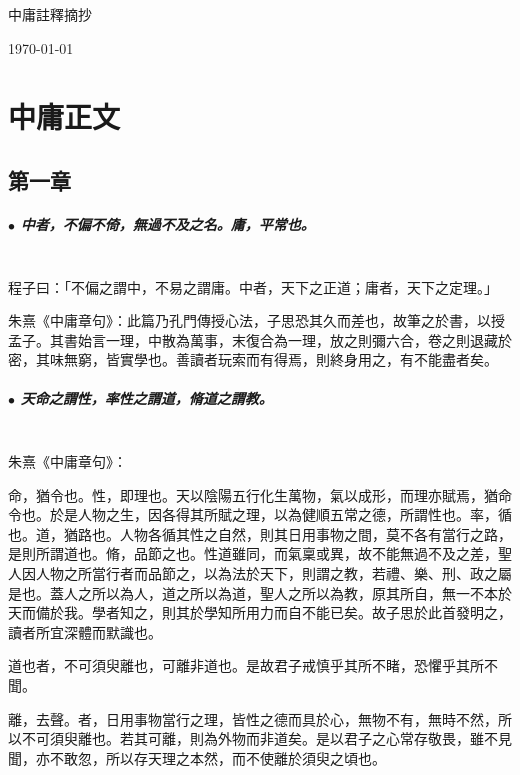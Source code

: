 \documentclass[hyperref, UTF8, 12pt, a4paper]{ctexrep}
\begin{document}
\begin{titlepage}
\centering
{}
{\sffamily\fontsize{30}{30}中庸註釋摘抄}\\

{\today}
\end{titlepage}

\section{中庸正文}



\subsection{第一章}

\subparagraph{$\bullet$ 中者，不偏不倚，無過不及之名。庸，平常也。} ~\\

程子曰：「不偏之謂中，不易之謂庸。中者，天下之正道；庸者，天下之定理。」

朱熹《中庸章句》：此篇乃孔門傳授心法，子思恐其久而差也，故筆之於書，以授孟子。其書始言一理，中散為萬事，末復合為一理，放之則彌六合，卷之則退藏於密，其味無窮，皆實學也。善讀者玩索而有得焉，則終身用之，有不能盡者矣。

\subparagraph{$\bullet$ 天命之謂性，率性之謂道，脩道之謂教。} ~\\

朱熹《中庸章句》：

\begin{adjustwidth}{2cm}{1cm}
\indent\indent 命，猶令也。性，即理也。天以陰陽五行化生萬物，氣以成形，而理亦賦焉，猶命令也。於是人物之生，因各得其所賦之理，以為健順五常之德，所謂性也。率，循也。道，猶路也。人物各循其性之自然，則其日用事物之間，莫不各有當行之路，是則所謂道也。脩，品節之也。性道雖同，而氣稟或異，故不能無過不及之差，聖人因人物之所當行者而品節之，以為法於天下，則謂之教，若禮、樂、刑、政之屬是也。蓋人之所以為人，道之所以為道，聖人之所以為教，原其所自，無一不本於天而備於我。學者知之，則其於學知所用力而自不能已矣。故子思於此首發明之，讀者所宜深體而默識也。

道也者，不可須臾離也，可離非道也。是故君子戒慎乎其所不睹，恐懼乎其所不聞。

離，去聲。者，日用事物當行之理，皆性之德而具於心，無物不有，無時不然，所以不可須臾離也。若其可離，則為外物而非道矣。是以君子之心常存敬畏，雖不見聞，亦不敢忽，所以存天理之本然，而不使離於須臾之頃也。
\end{adjustwidth}
\end{document}
